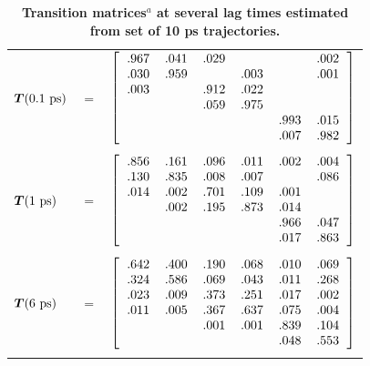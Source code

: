 \begin{table}[tbh]
\caption{{\bf Transition matrices$^a$ at several lag times estimated from set of 10 ps trajectories.}}
\label{long-times:table:transition-matrices}
\begin{center}
\small
\begin{tabular}{lcc}
\hline
${\mbox{\boldmath{$T$}}}(0.1~\mathrm{ps})$ & $=$ & 
$\left[
\begin{tabular}{cccccc}
.967 & .041 & .029 &      &      & .002 \\
.030 & .959 &      & .003 &      & .001 \\
.003 &      & .912 & .022 &      &      \\
     &      & .059 & .975 &      &      \\
     &      &      &      & .993 & .015 \\
     &      &      &      & .007 & .982 \\
 \end{tabular}
 \right]$ \\
\\
${\mbox{\boldmath{$T$}}}(1~\mathrm{ps})$ & $=$ & 
$\left[
\begin{tabular}{cccccc}
.856 & .161 & .096 & .011 & .002 & .004 \\
.130 & .835 & .008 & .007 &      & .086 \\
.014 & .002 & .701 & .109 & .001 &      \\
     & .002 & .195 & .873 & .014 &      \\
     &      &      &      & .966 & .047 \\
     &      &      &      & .017 & .863 \\
 \end{tabular}
 \right]$ \\
\\
${\mbox{\boldmath{$T$}}}(6~\mathrm{ps})$ & $=$ & 
$\left[
\begin{tabular}{cccccc}
.642 & .400 & .190 & .068 & .010 & .069 \\
.324 & .586 & .069 & .043 & .011 & .268 \\
.023 & .009 & .373 & .251 & .017 & .002 \\
.011 & .005 & .367 & .637 & .075 & .004 \\
     &      & .001 & .001 & .839 & .104 \\
     &      &      &      & .048 & .553 \\
 \end{tabular}
 \right]$ \\
 \\

\end{tabular}
\end{center}
\end{table}
